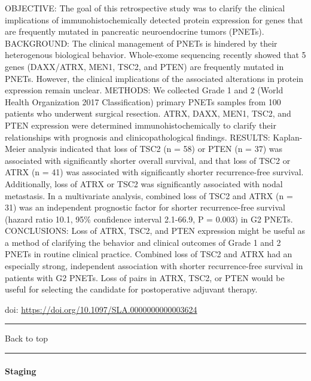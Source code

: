 \documentclass[
]{article}
\renewcommand{\linethickness}{0.05em}
\begin{document}
OBJECTIVE: The goal of this retrospective study was to clarify the
clinical implications of immunohistochemically detected protein
expression for genes that are frequently mutated in pancreatic
neuroendocrine tumors (PNETs). BACKGROUND: The clinical management of
PNETs is hindered by their heterogenous biological behavior. Whole-exome
sequencing recently showed that 5 genes (DAXX/ATRX, MEN1, TSC2, and
PTEN) are frequently mutated in PNETs. However, the clinical
implications of the associated alterations in protein expression remain
unclear. METHODS: We collected Grade 1 and 2 (World Health Organization
2017 Classification) primary PNETs samples from 100 patients who
underwent surgical resection. ATRX, DAXX, MEN1, TSC2, and PTEN
expression were determined immunohistochemically to clarify their
relationships with prognosis and clinicopathological findings. RESULTS:
Kaplan-Meier analysis indicated that loss of TSC2 (n = 58) or PTEN (n =
37) was associated with significantly shorter overall survival, and that
loss of TSC2 or ATRX (n = 41) was associated with significantly shorter
recurrence-free survival. Additionally, loss of ATRX or TSC2 was
significantly associated with nodal metastasis. In a multivariate
analysis, combined loss of TSC2 and ATRX (n = 31) was an independent
prognostic factor for shorter recurrence-free survival (hazard ratio
10.1, 95\% confidence interval 2.1-66.9, P = 0.003) in G2 PNETs.
CONCLUSIONS: Loss of ATRX, TSC2, and PTEN expression might be useful as
a method of clarifying the behavior and clinical outcomes of Grade 1 and
2 PNETs in routine clinical practice. Combined loss of TSC2 and ATRX had
an especially strong, independent association with shorter
recurrence-free survival in patients with G2 PNETs. Loss of pairs in
ATRX, TSC2, or PTEN would be useful for selecting the candidate for
postoperative adjuvant therapy.

doi: \url{https://doi.org/10.1097/SLA.0000000000003624}

\begin{center}\rule{0.5\linewidth}{\linethickness}\end{center}

Back to top

\begin{center}\rule{0.5\linewidth}{\linethickness}\end{center}

\pagebreak

\hypertarget{staging-1}{%
\paragraph{Staging}\label{staging-1}}
\end{document}
